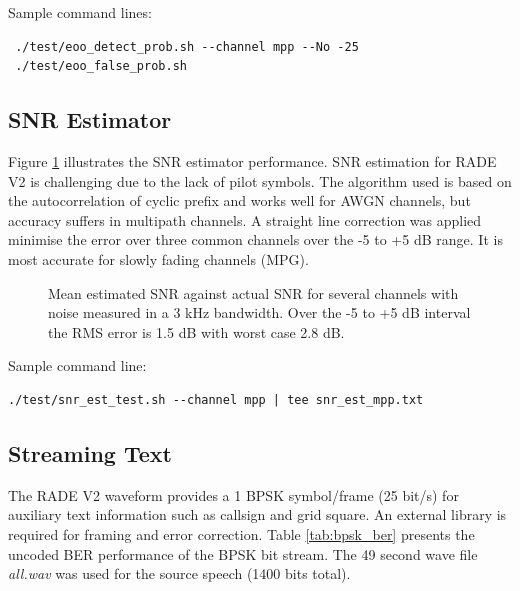 \documentclass{article}
\begin{document}
Sample command lines:
\begin{verbatim}
 ./test/eoo_detect_prob.sh --channel mpp --No -25
 ./test/eoo_false_prob.sh
\end{verbatim}

\subsection{SNR Estimator}

Figure \ref{fig:v2_snr_est} illustrates the SNR estimator performance.  SNR estimation for RADE V2 is challenging due to the lack of pilot symbols.  The algorithm used is based on the autocorrelation of cyclic prefix and works well for AWGN channels, but accuracy suffers in multipath channels.  A straight line correction was applied minimise the error over three common channels over the -5 to +5 \si{dB} range.  It is most accurate for slowly fading channels (MPG).

\begin{figure}[H]
\caption{Mean estimated SNR against actual SNR for several channels with noise measured in a 3 \si{kHz} bandwidth. Over the -5 to +5 dB interval the RMS error is 1.5 \si{dB} with worst case 2.8 \si{dB}.}
\label{fig:v2_snr_est}
\begin{center}
\end{center}
\end{figure}

Sample command line:
\begin{verbatim}
./test/snr_est_test.sh --channel mpp | tee snr_est_mpp.txt
\end{verbatim}

\subsection{Streaming Text}

The RADE V2 waveform provides a 1 BPSK symbol/frame (25 bit/s) for auxiliary text information such as callsign and grid square.  An external library is required for framing and error correction.  Table \ref{tab:bpsk_ber} presents the uncoded BER performance of the BPSK bit stream.  The 49 second wave file \emph{all.wav} was used for the source speech (1400 bits total).
 
\end{document}
